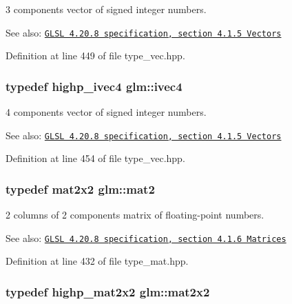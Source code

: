 3 components vector of signed integer numbers.

\begin{Desc}
\item[See also:]\href{http://www.opengl.org/registry/doc/GLSLangSpec.4.20.8.pdf}{\tt GLSL 4.20.8 specification, section 4.1.5 Vectors} \end{Desc}


Definition at line 449 of file type\_\-vec.hpp.\hypertarget{group__core__types_ga4560ddc50320ea8f8a70d5c9c249fea}{
\subsubsection[ivec4]{\setlength{\rightskip}{0pt plus 5cm}typedef highp\_\-ivec4 {\bf glm::ivec4}}}
\label{group__core__types_ga4560ddc50320ea8f8a70d5c9c249fea}


4 components vector of signed integer numbers.

\begin{Desc}
\item[See also:]\href{http://www.opengl.org/registry/doc/GLSLangSpec.4.20.8.pdf}{\tt GLSL 4.20.8 specification, section 4.1.5 Vectors} \end{Desc}


Definition at line 454 of file type\_\-vec.hpp.\hypertarget{group__core__types_g8357ec0aab6f8cf69313592492663c3f}{
\subsubsection[mat2]{\setlength{\rightskip}{0pt plus 5cm}typedef mat2x2 {\bf glm::mat2}}}
\label{group__core__types_g8357ec0aab6f8cf69313592492663c3f}


2 columns of 2 components matrix of floating-point numbers.

\begin{Desc}
\item[See also:]\href{http://www.opengl.org/registry/doc/GLSLangSpec.4.20.8.pdf}{\tt GLSL 4.20.8 specification, section 4.1.6 Matrices} \end{Desc}


Definition at line 432 of file type\_\-mat.hpp.\hypertarget{group__core__types_geddc14adb4963d9bad73866cc202fb40}{
\subsubsection[mat2x2]{\setlength{\rightskip}{0pt plus 5cm}typedef highp\_\-mat2x2 {\bf glm::mat2x2}}}
\label{group__core__types_geddc14adb4963d9bad73866cc202fb40}


